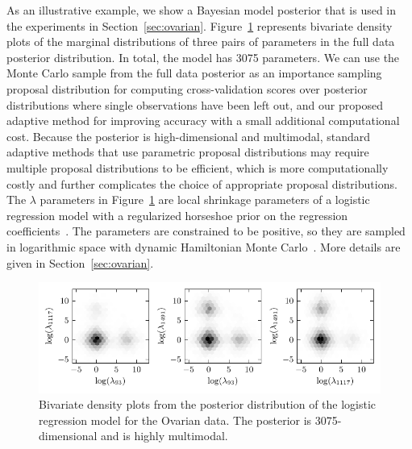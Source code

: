 \documentclass[12pt]{article}
\begin{document}
As an illustrative example, we show a Bayesian model posterior that is used in the experiments in Section~\ref{sec:ovarian}. Figure~\ref{fig:ovarian_hex} represents bivariate density plots of the marginal distributions
of three pairs of parameters in the full data posterior distribution. In total, the model has 3075 parameters.
We can use the Monte Carlo sample from the full data posterior
as an importance sampling proposal distribution for computing
cross-validation scores over posterior distributions where single observations have been left out, and our proposed adaptive method
for improving accuracy with a small additional computational cost.
Because the posterior is high-dimensional and
multimodal, standard adaptive methods
that use parametric proposal distributions may require multiple proposal distributions to be efficient,
which is more computationally costly and further complicates the choice of appropriate proposal distributions.
The $\lambda$ parameters in Figure~\ref{fig:ovarian_hex}  are local shrinkage parameters of a logistic regression model with a regularized horseshoe prior on the regression coefficients~\citep{piironen2017rhs}. The parameters are constrained to be positive, so they are sampled in logarithmic space with dynamic Hamiltonian Monte Carlo~\citep{hoffman2014no,Betancourt2017}.
More details are given in Section~\ref{sec:ovarian}.
\begin{figure}[t]
\centering
\includegraphics[width=\textwidth]{figs/ovarian_hex7.pdf}
\caption{Bivariate density plots from the posterior distribution of the logistic regression model
for the Ovarian data. The posterior is 3075-dimensional and is highly multimodal.} \label{fig:ovarian_hex}
\end{figure}














%
%
%
%
%

%
%
%
%
%
\end{document}
